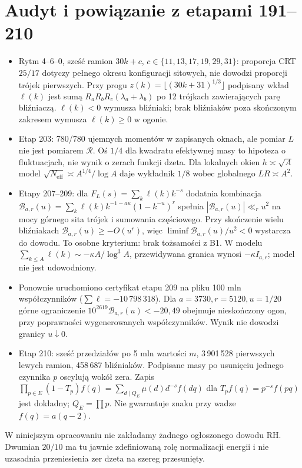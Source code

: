 \documentclass[11pt,a4paper]{article}
\newcommand{\R}{\mathcal R}
\begin{document}
\section{Audyt i powiązanie z etapami 191--210}
\begin{itemize}
\item Rytm 4--6--0, sześć ramion $30k+c$, $c\in\{11,13,17,19,29,31\}$: proporcja CRT $25/17$ dotyczy pełnego okresu konfiguracji sitowych, nie dowodzi proporcji trójek pierwszych. Przy progu $z(k)=\lfloor(30k+31)^{1/3}\rfloor$ podpisany wkład $\ell(k)$ jest sumą $R_aR_bR_c(\lambda_a+\lambda_b)$ po 12 trójkach zawierających parę bliźniaczą. $\ell(k)<0$ wymusza bliźniaki; brak bliźniaków poza skończonym zakresem wymusza $\ell(k)\ge0$ w ogonie.
\item Etap 203: 780/780 ujemnych momentów w zapisanych oknach, ale pomiar $L$ nie jest pomiarem $\R$. Oś $1/4$ dla kwadratu efektywnej masy to hipoteza o fluktuacjach, nie wynik o zerach funkcji dzeta. Dla lokalnych okien $h\asymp\sqrt A$ model $\sqrt{N_{\mathrm{eff}}}\asymp A^{1/4}/\log A$ daje wykładnik $1/8$ wobec globalnego $LR\asymp A^2$.
\item Etapy 207--209: dla $F_L(s)=\sum_k\ell(k)k^{-s}$ dodatnia kombinacja $\mathcal B_{a,r}(u)=\sum_k\ell(k)k^{-1-au}(1-k^{-u})^r$ spełnia $|\mathcal B_{a,r}(u)|\ll_r u^2$ na mocy górnego sita trójek i sumowania częściowego. Przy skończenie wielu bliźniakach $\mathcal B_{a,r}(u)\ge-O(u^r)$, więc $\liminf\mathcal B_{a,r}(u)/u^2<0$ wystarcza do dowodu. To osobne kryterium: brak tożsamości z B1. W modelu $\sum_{k\le A}\ell(k)\sim-\kappa A/\log^3 A$, przewidywana granica wynosi $-\kappa I_{a,r}$; model nie jest udowodniony.
\item Ponownie uruchomiono certyfikat etapu 209 na pliku 100 mln współczynników ($\sum\ell=-10\,798\,318$). Dla $a=3730,r=5120,u=1/20$ górne ograniczenie $10^{2619}\mathcal B_{a,r}(u)<-20{,}49$ obejmuje nieskończony ogon, przy poprawności wygenerowanych współczynników. Wynik nie dowodzi granicy $u\downarrow0$.
\item Etap 210: sześć przedziałów po 5 mln wartości $m$, 3\,901\,528 pierwszych lewych ramion, 458\,687 bliźniaków. Podpisane masy po usunięciu jednego czynnika $p$ oscylują wokół zera. Zapis $\prod_{p\in E}(1-T_p)f(q)=\sum_{d\mid Q_E}\mu(d)d^{-s}f(dq)$ dla $T_pf(q)=p^{-s}f(pq)$ jest dokładny; $Q_E=\prod p$. Nie gwarantuje znaku przy wadze $f(q)=a(q-2)$.
\end{itemize}
W niniejszym opracowaniu nie zakładamy żadnego ogłoszonego dowodu RH. Dwumian $20/10$ ma tu jawnie zdefiniowaną rolę normalizacji energii i nie uzasadnia przeniesienia zer dzeta na szereg przesunięty.
\end{document}
